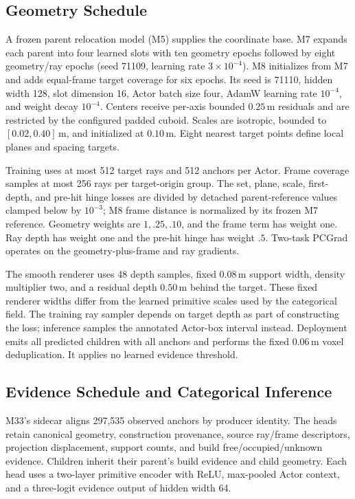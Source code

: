\subsection{Geometry Schedule}

A frozen parent relocation model (M5) supplies the coordinate base.
M7 expands each parent into four learned slots with ten geometry epochs followed by eight geometry/ray epochs
(seed 71109, learning rate $3\times10^{-4}$).
M8 initializes from M7 and adds equal-frame target coverage for six epochs.
Its seed is 71110, hidden width 128, slot dimension 16, Actor batch size four, AdamW learning rate
$10^{-4}$, and weight decay $10^{-4}$.
Centers receive per-axis bounded $0.25$\,m residuals and are restricted by the configured padded cuboid.
Scales are isotropic, bounded to $[0.02,0.40]$\,m, and initialized at $0.10$\,m.
Eight nearest target points define local planes and spacing targets.

Training uses at most 512 target rays and 512 anchors per Actor.
Frame coverage samples at most 256 rays per target-origin group.
The set, plane, scale, first-depth, and pre-hit hinge losses are divided by detached parent-reference
values clamped below by $10^{-3}$; M8 frame distance is normalized by its frozen M7 reference.
Geometry weights are $1,.25,.10$, and the frame term has weight one.
Ray depth has weight one and the pre-hit hinge has weight $.5$.
Two-task PCGrad operates on the geometry-plus-frame and ray gradients.

The smooth renderer uses 48 depth samples, fixed $0.08$\,m support width, density multiplier two,
and a residual depth $0.50$\,m behind the target.
These fixed renderer widths differ from the learned primitive scales used by the categorical field.
The training ray sampler depends on target depth as part of constructing the loss; inference samples
the annotated Actor-box interval instead.
Deployment emits all predicted children with all anchors and performs the fixed $0.06$\,m voxel deduplication.
It applies no learned evidence threshold.

\subsection{Evidence Schedule and Categorical Inference}

M33's sidecar aligns 297,535 observed anchors by producer identity. The heads retain canonical geometry,
construction provenance, source ray/frame descriptors, projection displacement, support counts, and
build free/occupied/unknown evidence. Children inherit their parent's build evidence and child geometry.
Each head uses a two-layer primitive encoder with ReLU, max-pooled Actor context, and a three-logit
evidence output of hidden width 64.


